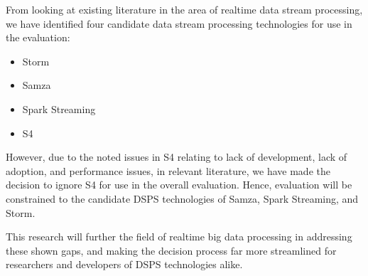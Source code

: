 From looking at existing literature in the area of realtime data stream processing, we have identified four candidate
data stream processing technologies for use in the evaluation:
\begin{itemize}
  \item Storm
  \item Samza
  \item Spark Streaming
  \item S4
\end{itemize}
However, due to the noted issues in S4 relating to lack of development, lack of adoption, and performance issues, in relevant
literature, we have made the decision to ignore S4 for use in the overall evaluation. Hence, evaluation will be constrained
to the candidate DSPS technologies of Samza, Spark Streaming, and Storm.

This research will further the field of realtime big data processing in addressing these shown gaps, and making the
decision process far more streamlined for researchers and developers of DSPS technologies alike.


